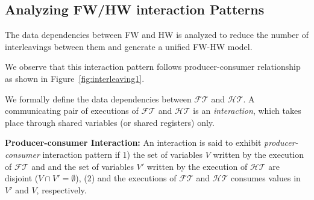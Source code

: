 \documentclass[sigconf]{acmart}
\newcommand{\Omit}[1]{}
\begin{document}
\subsection{Analyzing FW/HW interaction Patterns}
The data dependencies between FW and HW is analyzed 
to reduce the number of interleavings between them and 
generate a unified FW-HW model. 
\Omit{
Recall that a HW transaction $(\mathcal{HT})$ is in response to a FW transaction 
$(\mathcal{FT})$. Similarly, $\mathcal{FT}$ is in response to the 
inputs from $\mathcal{HT}$ or operating system or application level software. 
The specific interaction pattern between $\mathcal{FT}$ 
and $\mathcal{HT}$ is exploited to generate a 
unified FW-HW model, $\mathcal{PN}$, in C. 
}
We observe that this interaction pattern follows 
producer-consumer relationship as shown in 
Figure~\ref{fig:interleaving1}. 
\Omit{
In practice, a FW thread 
is mostly independent of the HW thread they interact with~\cite{hvc}.  
Specifically, a FW thread is only responsible for configuring the 
HW transactions by writing to memory mapped registers 
or polling the interrupt status register for data transmission or 
receiving incoming data packets. 
}
We formally define the data dependencies between $\mathcal{FT}$ 
and $\mathcal{HT}$. A communicating pair of executions of 
$\mathcal{FT}$ and $\mathcal{HT}$ is an {\em interaction}, which 
takes place through shared variables (or shared registers)
only.

\Omit{
\textbf{Producer:} 
$\mathcal{FT}$ (or $\mathcal{HT}$) is called a {\em producer} 
if it produces a data ($d$) that is independent of $\mathcal{HT}$ (or $\mathcal{FT}$). 
Thus, the interleavings between $\mathcal{FT}$ and $\mathcal{HT}$ 
can be avoided to compute $d$. 
}

\textbf{Producer-consumer Interaction:}
%
An interaction is said to exhibit {\em producer-consumer}
interaction pattern if 1) the set of variables $V$ written by 
the execution of $\mathcal{FT}$ and and the set of variables 
$V'$ written by the execution of $\mathcal{HT}$ are disjoint 
($V \cap V' = \emptyset$), (2) and the executions 
of $\mathcal{FT}$ and $\mathcal{HT}$ consumes values 
in $V'$ and $V$, respectively.

\Omit{
shared register only FT is writing 
shared register that HT is writing 
and these two sets are disjoint
$\mathcal{FT}$ and $\mathcal{HT}$ is said to exhibit   
{\em producer-consumer} interaction pattern specific 
to data $d$ if $\mathcal{FT}$ produces $d$ and $\mathcal{HT}$ 
consumes $d$. Similarly, when $\mathcal{HT}$
is a producer of $d$ and $\mathcal{FT}$ is a consumer of $d$, 
$\mathcal{HT}$ and $\mathcal{FT}$ is said to exhibit   
{\em producer-consumer} interaction pattern specific to $d$. 
A producer-consumer interaction is defined with respect 
to the data produced. 
}
\end{document}
